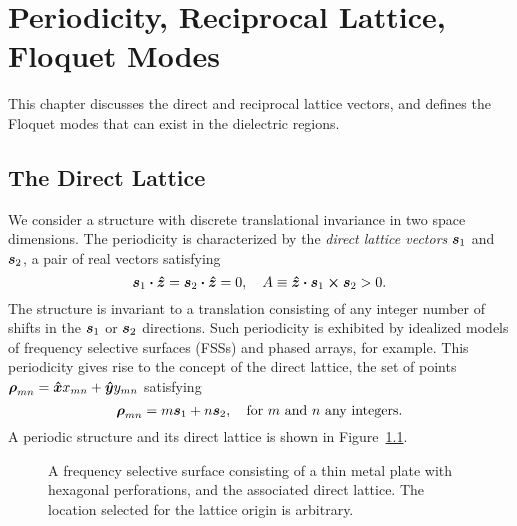
\chapter{Periodicity, Reciprocal Lattice, Floquet Modes}
\label{chap:periodicity}

This chapter discusses the direct and reciprocal lattice vectors, and
defines the Floquet modes that can exist in the dielectric regions.

\section{The Direct Lattice}
We consider a structure with discrete translational invariance in two space
dimensions.  The periodicity is characterized by the {\em direct lattice
  vectors} $\boldsymbol{s}_1$ and $\boldsymbol{s}_2$, a pair of real vectors satisfying
\begin{equation}
  \boldsymbol{s}_1 \boldsymbol{\cdot} \boldsymbol{\hat{z}} = \boldsymbol{s}_2 \boldsymbol{\cdot} \boldsymbol{\hat{z}} = 0, \quad A \equiv \boldsymbol{\hat{z}} \boldsymbol{\cdot} \boldsymbol{s}_1 \boldsymbol{\times} \boldsymbol{s}_2 > 0.
\end{equation}
The structure is invariant to a translation consisting of any integer number of
shifts in the $\boldsymbol{s}_1$ or $\boldsymbol{s}_2$ directions.  Such periodicity
is exhibited by idealized models of frequency selective surfaces
(FSSs) and phased arrays, for example.
This periodicity gives rise to the concept of the {direct lattice},
the set of points $\boldsymbol{\rho}_{mn} = \boldsymbol{\hat{x}} x_{mn} + \boldsymbol{\hat{y}} y_{mn}$ satisfying
\begin{equation}
  \boldsymbol{\rho}_{mn} = m \boldsymbol{s}_1 + n \boldsymbol{s}_2, \quad \text{for $m$ and $n$ any integers.}
\end{equation}
A periodic structure and its direct lattice is shown in
Figure~\ref{fig:direct}.
\begin{figure}[htbp]
  \begin{center}
    \caption{A frequency selective surface consisting of a thin metal plate
        with hexagonal perforations, and the associated direct
        lattice. The location selected for the lattice origin is arbitrary.}
    \label{fig:direct}
  \end{center}
\end{figure}

